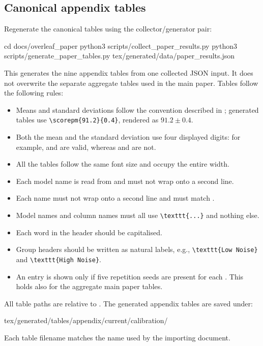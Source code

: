 \documentclass[11pt]{article}
\begin{document}
\FloatBarrier
\subsection{Canonical appendix tables}
Regenerate the canonical tables using the collector/generator pair:
\begin{DocCode}
cd docs/overleaf_paper
python3 scripts/collect_paper_results.py
python3 scripts/generate_paper_tables.py tex/generated/data/paper_results.json
\end{DocCode}
This generates the nine appendix tables from one collected JSON input. It does not overwrite the separate aggregate tables used in the main paper.
Tables follow the following rules:
\begin{itemize}
\item Means and standard deviations follow the convention described in ; generated tables use \verb|\scorepm{91.2}{0.4}|, rendered as \(91.2 \pm {\scriptstyle 0.4}\).
\item Both the mean and the standard deviation use four displayed digits: for example,  and  are valid, whereas  and  are not.
\item All the tables follow the same font size and occupy the entire width.
\item Each model name is read from  and must not wrap onto a second line.
\item Each \termSimulator name must not wrap onto a second line and must match .
\item Model names and column names must all use \verb|\texttt{...}| and nothing else.
\item Each word in the header should be capitalised.
\item Group headers should be written as natural labels, e.g., \verb|\texttt{Low Noise}| and \verb|\texttt{High Noise}|.
\item An entry is shown only if five repetition seeds are present for each \termSimulator.
This holds also for the aggregate main paper tables.
\end{itemize}
All table paths are relative to . The generated appendix tables are saved under:
\begin{DocCode}
tex/generated/tables/appendix/current/calibration/
\end{DocCode}
Each table filename matches the name used by the importing document.
\end{document}
